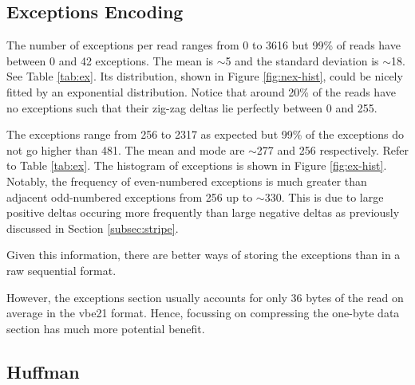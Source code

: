 

\subsection{Exceptions Encoding}

The number of exceptions per read ranges from 0 to 3616 but 99\% of reads have between 0 and 42 exceptions. The mean is $\sim$5 and the standard deviation is $\sim$18. See Table \ref{tab:ex}. Its distribution, shown in Figure \ref{fig:nex-hist}, could be nicely fitted by an exponential distribution. Notice that around 20\% of the reads have no exceptions such that their zig-zag deltas lie perfectly between 0 and 255.




The exceptions range from 256 to 2317 as expected but 99\% of the exceptions do not go higher than 481. The mean and mode are $\sim$277 and 256 respectively. Refer to Table \ref{tab:ex}. The histogram of exceptions is shown in Figure \ref{fig:ex-hist}. Notably, the frequency of even-numbered exceptions is much greater than adjacent odd-numbered exceptions from 256 up to $\sim$330. This is due to large positive deltas occuring more frequently than large negative deltas as previously discussed in Section \ref{subsec:stripe}.



Given this information, there are better ways of storing the exceptions than in a raw sequential format.


However, the exceptions section usually accounts for only 36 bytes of the read on average in the vbe21 format. Hence, focussing on compressing the one-byte data section has much more potential benefit.

\subsection{Huffman}

